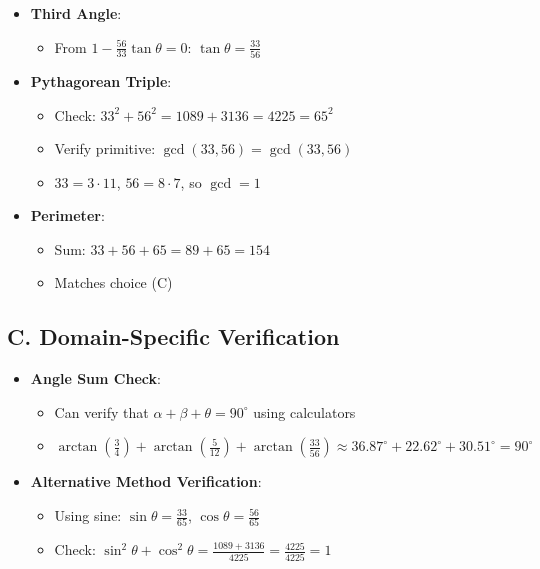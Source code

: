 \documentclass[12pt]{article}
\begin{document}
\begin{verificationbox}
\begin{itemize}[leftmargin=*]
    \item \textbf{Third Angle}:
    \begin{itemize}
        \item From $1 - \frac{56}{33} \tan\theta = 0$: $\tan\theta = \frac{33}{56}$ \checkmark
    \end{itemize}
    
    \item \textbf{Pythagorean Triple}:
    \begin{itemize}
        \item Check: $33^2 + 56^2 = 1089 + 3136 = 4225 = 65^2$ \checkmark
        \item Verify primitive: $\gcd(33, 56) = \gcd(33, 56)$
        \item $33 = 3 \cdot 11$, $56 = 8 \cdot 7$, so $\gcd = 1$ \checkmark
    \end{itemize}
    
    \item \textbf{Perimeter}:
    \begin{itemize}
        \item Sum: $33 + 56 + 65 = 89 + 65 = 154$ \checkmark
        \item Matches choice (C)
    \end{itemize}
\end{itemize}

\subsection*{C. Domain-Specific Verification}
\begin{itemize}[leftmargin=*]
    \item \textbf{Angle Sum Check}:
    \begin{itemize}
        \item Can verify that $\alpha + \beta + \theta = 90^{\circ}$ using calculators
        \item $\arctan(\frac{3}{4}) + \arctan(\frac{5}{12}) + \arctan(\frac{33}{56}) \approx 36.87^{\circ} + 22.62^{\circ} + 30.51^{\circ} = 90^{\circ}$ \checkmark
    \end{itemize}
    
    \item \textbf{Alternative Method Verification}:
    \begin{itemize}
        \item Using sine: $\sin\theta = \frac{33}{65}$, $\cos\theta = \frac{56}{65}$
        \item Check: $\sin^2\theta + \cos^2\theta = \frac{1089 + 3136}{4225} = \frac{4225}{4225} = 1$ \checkmark
    \end{itemize}
\end{itemize}
\end{verificationbox}
\end{document}
